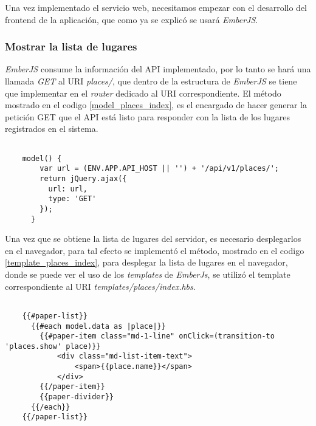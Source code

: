 Una vez implementado el servicio web, necesitamos empezar con el desarrollo del frontend de la aplicación, que como ya se explicó se usará \emph{EmberJS}. \\


\subsubsection{Mostrar la lista de lugares}


\emph{EmberJS} consume la información del API implementado, por lo tanto se hará una llamada \emph{GET} al URI \emph{places/}, que dentro de la estructura de \emph{EmberJS} se tiene que implementar en el \emph{router} dedicado al URI correspondiente. El método mostrado en el codigo \ref{model_places_index}, es el encargado de hacer generar la petición GET que el API está listo para responder con la lista de los lugares registrados en el sistema. \\

\begin{center}
  \begin{lstlisting}[label=model_places_index,caption=Método para obtener la lista de lugares del API]

    model() {
        var url = (ENV.APP.API_HOST || '') + '/api/v1/places/';
        return jQuery.ajax({
          url: url,
          type: 'GET'
        });
      }

  \end{lstlisting}
\end{center}

Una vez que se obtiene la lista de lugares del servidor, es necesario desplegarlos en el navegador, para tal efecto se implement\'o el método, mostrado en el codigo \ref{template_places_index}, para desplegar la lista de lugares en el navegador, donde se puede ver el uso de los \emph{templates} de \emph{EmberJs}, se utilizó el template correspondiente al URI \emph{templates/places/index.hbs}.

\begin{center}
  \begin{lstlisting}[label=template_places_index,caption=Template de la lista de lugares]

    {{#paper-list}}
      {{#each model.data as |place|}}
        {{#paper-item class="md-1-line" onClick=(transition-to 'places.show' place)}}
            <div class="md-list-item-text">
                <span>{{place.name}}</span>
            </div>
        {{/paper-item}}
        {{paper-divider}}
      {{/each}}
    {{/paper-list}}

  \end{lstlisting}
\end{center}


